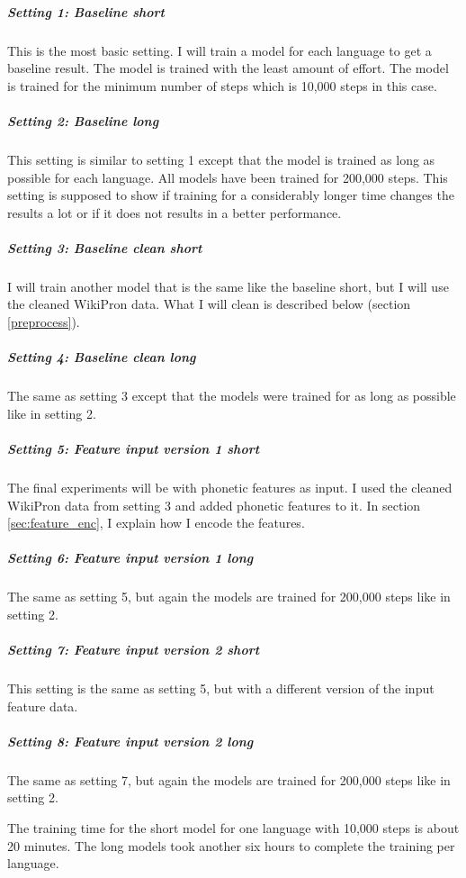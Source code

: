 \subparagraph{Setting 1: Baseline short}
This is the most basic setting. I will train a model for each language to get a baseline result. The model is trained with the least amount of effort. The model is trained for the minimum number of steps which is 10,000 steps in this case. 

\subparagraph{Setting 2: Baseline long}
This setting is similar to setting 1 except that the model is trained as long as possible for each language. All models have been trained for 200,000 steps. This setting is supposed to show if training for a considerably longer time changes the results a lot or if it does not results in a better performance.

\subparagraph{Setting 3: Baseline clean short}
I will train another model that is the same like the baseline short, but I will use the cleaned WikiPron data. What I will clean is described below (section \ref{preprocess}).

\subparagraph{Setting 4: Baseline clean long}
The same as setting 3 except that the models were trained for as long as possible like in setting 2.

\subparagraph{Setting 5: Feature input version 1 short}
The final experiments will be with phonetic features as input. I used the cleaned WikiPron data from setting 3 and added phonetic features to it. In section \ref{sec:feature_enc}, I explain how I encode the features. 

\subparagraph{Setting 6: Feature input version 1 long}
The same as setting 5, but again the models are trained for 200,000 steps like in setting 2.

\subparagraph{Setting 7: Feature input version 2 short}
This setting is the same as setting 5, but with a different version of the input feature data.

\subparagraph{Setting 8: Feature input version 2 long}
The same as setting 7, but again the models are trained for 200,000 steps like in setting 2.


The training time for the short model for one language with 10,000 steps is about 20 minutes. The long models took another six hours to complete the training per language.

